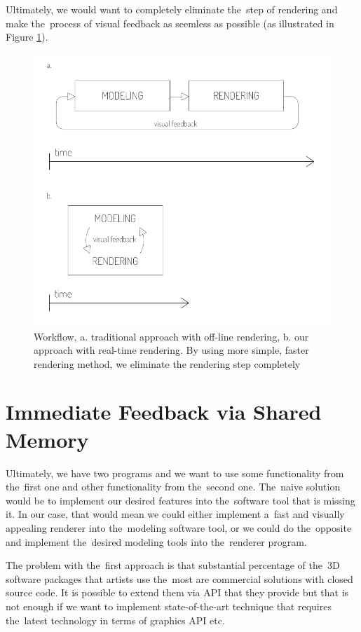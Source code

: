 \documentclass[
  digital, %
  table,   %
  nolof,     %
  nolot,     %
  oneside,
]{fithesis3}
\begin{document}
Ultimately, we would want to completely eliminate the step of rendering and make the process of visual feedback as seemless as possible (as illustrated in Figure \ref{fig:workflow-before-after}).

\begin{figure}
  \centering
  \includegraphics[scale=1.0]{images/workflow-smaller.pdf}
  \caption{Workflow, a. traditional approach with off-line rendering, b. our approach with real-time rendering. By using more simple, faster rendering method, we eliminate the rendering step completely}
  \label{fig:workflow-before-after}
\end{figure}

\section{Immediate Feedback via Shared Memory}
Ultimately, we have two programs and we want to use some functionality from the first one and other functionality from the second one. The naive solution would be to implement our desired features into the software tool that is missing it. In our case, that would mean we could either implement a fast and visually appealing renderer into the modeling software tool, or we could do the opposite and implement the desired modeling tools into the renderer program.

The problem with the first approach is that substantial percentage of the 3D software packages that artists use the most are commercial solutions with closed source code. It is possible to extend them via API that they provide but that is not enough if we want to implement state-of-the-art technique that requires the latest technology in terms of graphics API etc.
\end{document}
